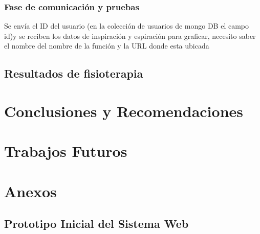 \documentclass[12pt]{article}
\begin{document}
\subsubsection{Fase de comunicación y pruebas}

Se envía el ID del usuario  (en la colección de usuarios de mongo DB el campo id)y se reciben los datos de inspiración y espiración para graficar, necesito saber el nombre del nombre de la función y la URL donde esta ubicada



\subsection{Resultados de fisioterapia}



\section{Conclusiones y Recomendaciones}


\section{Trabajos Futuros}




\newpage





\nocite{1}
\nocite{2}
\nocite{3}
\nocite{4}
\nocite{5}




\section{Anexos}
\subsection{Prototipo Inicial del Sistema Web} 
\end{document}
